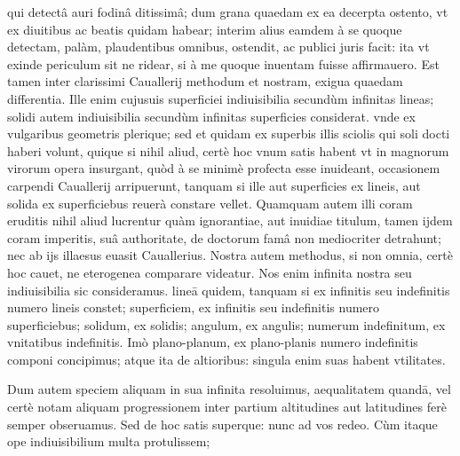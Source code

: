 \documentclass[11pt,a4paper]{article}
\begin{document}
qui detectâ auri fodinâ ditissimâ; dum grana quaedam ex ea decerpta ostento, vt ex diuitibus ac beatis quidam habear; interim alius eamdem à se quoque detectam, palàm, plaudentibus omnibus, ostendit, ac publici juris facit: ita vt exinde periculum sit ne ridear, si à me quoque inuentam fuisse affirmauero. Est tamen inter clarissimi Cauallerij methodum et nostram, exigua quaedam differentia. Ille enim cujusuis superficiei indiuisibilia secundùm infinitas lineas; solidi autem indiuisibilia secundùm infinitas superficies considerat. vnde ex vulgaribus geometris plerique; sed et quidam ex superbis illis sciolis qui soli docti haberi volunt, quique si nihil aliud, certè hoc vnum satis habent vt in magnorum virorum opera insurgant, quòd à se minimè profecta esse inuideant, occasionem carpendi Cauallerij arripuerunt, tanquam si ille aut superficies ex lineis, aut solida ex superficiebus reuerà constare vellet. Quamquam autem illi coram eruditis nihil aliud lucrentur quàm ignorantiae, aut inuidiae titulum, tamen ijdem coram imperitis, suâ authoritate, de doctorum famâ non mediocriter detrahunt; nec ab ijs illaesus euasit Cauallerius. Nostra autem methodus, si non omnia, certè hoc cauet, ne eterogenea comparare videatur. Nos enim infinita nostra seu indiuisibilia sic consideramus. lineā quidem, tanquam si ex infinitis seu indefinitis numero lineis constet; superficiem, ex infinitis seu indefinitis numero superficiebus; solidum, ex solidis; angulum, ex angulis; numerum indefinitum, ex vnitatibus indefinitis. Imò plano-planum, ex plano-planis numero indefinitis componi concipimus; atque ita de altioribus: singula enim suas habent vtilitates.

Dum autem speciem aliquam in sua infinita resoluimus, aequalitatem quandā, vel certè notam aliquam progressionem inter partium altitudines aut latitudines ferè semper obseruamus. Sed de hoc satis superque: nunc ad vos redeo. Cùm itaque ope indiuisibilium multa protulissem;

\end{document}
